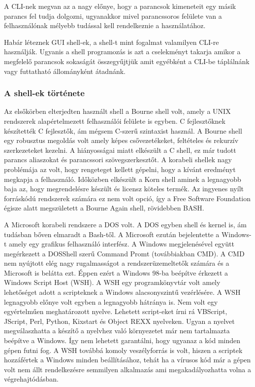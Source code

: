 \documentclass[12pt,oneside,justify,table]{book}
\begin{document}
A CLI-nek megvan az a nagy előnye, hogy a parancsok kimeneteit egy másik parancs fel tudja dolgozni, ugyanakkor mivel parancssoros felülete van a felhasználónak mélyebb tudással kell rendelkeznie a használatához.

Habár léteznek GUI shell-ek, a shell-t mint fogalmat valamilyen CLI-re használják. Ugyanis a shell programozás is azt a cselekményt takarja amikor a megfelelő parancsok sokaságát összegyűjtjük amit egyébként a CLI-be táplálnánk vagy futtatható állományként átadnánk.
\cite{WindowsPowerShellUnleashed}

\subsubsection{A shell-ek története}
Az elsőkörben elterjedten használt shell a Bourne shell volt, amely a UNIX rendszerek alapértelmezett felhasználói felülete is egyben. C fejlesztőknek készítették C fejlesztők, ám mégsem C-szerű szintaxist használ. A Bourne shell egy robusztus megoldás volt amely képes csővezetékeket, feltételes és rekurzív szerkezeteket kezelni. A hiányosságai miatt elkészült a C shell, ez már tudott parancs aliaszokat és parancssori szövegszerkesztőt. A korabeli shellek nagy problémája az volt, hogy rengeteget kellett gépelni, hogy a kívánt eredményt megkapja a felhasználó. 
Időközben elkészült a Korn shell aminek a legnagyobb baja az, hogy megrendelésre készült és licensz köteles termék. Az ingyenes nyílt forráskódú rendszerek számára ez nem volt opció, így a Free Software Foundation égisze alatt megszületett a Bourne Again shell, rövidebben BASH.

A Microsoft korabeli rendszere a DOS volt. A DOS egyben shell és kernel is, ám tudásban bőven elmaradt a Bash-től. A Microsoft ezután bejelentette a Windows-t amely egy grafikus felhasználó interfész. A Windows megjelenésével együtt megérkezett a DOSShell szerű Command Promt (továbbiakban CMD). 
A CMD nem nyújtott elég nagy rugalmasságot a rendszerüzemeltetők számára és a Microsoft is belátta ezt. Éppen ezért a Windows 98-ba beépítve érkezett a Windows Script Host (WSH). A WSH egy programkönyvtár volt amely lehetőséget adott a scripteknek a Windows alacsonyszintű vezérlésére.
A WSH legnagyobb előnye volt egyben a legnagyobb hátránya is. Nem volt egy egyértelműen meghatározott nyelve. Lehetett script-eket írni rá VBScript, JScript, Perl, Python, Kixstart és Object REXX nyelveken. Ugyan a nyelvet megválaszhatta a készítő a nyelvhez való környezetet már nem tartalmazta beépítve a Windows. Így nem lehetett garantálni, hogy ugyanaz a kód minden gépen futni fog. A WSH továbbá komoly veszélyforrás is volt, hiszen a scriptek hozzáfértek a Windows minden beállításához, tehát ha a vírusos kód már a gépen volt nem állt rendelkezésre semmilyen alkalmazás ami megakadályozhatta volna a végrehajtódásban.
\end{document}
